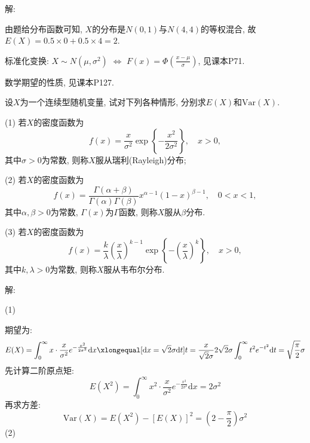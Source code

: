 \documentclass[standard]{ExBook}
\renewenvironment{shaded}{%
  \def\FrameCommand{\fboxsep=\FrameSep \colorbox{shadecolor}}%
  \MakeFramed{\advance\hsize-\width \FrameRestore}%
}{%
  \endMakeFramed
}
\begin{document}
\begin{qitems}
\vspace{\dimexpr2.5cm-5em\relax}

解: 

由题给分布函数可知, $X$的分布是$N(0,1)$与$N(4,4)$的等权混合, 故$E(X)=0.5\times0+0.5\times4=2$.

\textcolor{themeColor}{\selectfont {}
标准化变换: $X\sim N(\mu,\sigma^2)$ $\Longleftrightarrow$ $F(x)=\Phi(\frac{x-\mu}{\sigma})$, 见课本P71.}

\textcolor{themeColor}{\selectfont {}
数学期望的性质, 见课本P127.}

\vspace{2.5cm-5em}

    \begin{bbox}
    \begin{shaded}
        \qitem
设$X$为一个连续型随机变量, 试对下列各种情形, 分别求$E ( X ) $和$\mathrm{Var}(X)$.

(1) 若$X$的密度函数为
$$f(x)=\displaystyle\frac{x}{\sigma^2}\exp\left\{-\frac{x^2}{2\sigma^2}\right\},\quad x>0,$$
其中$\sigma>0$为常数, 则称$X$服从瑞利(Rayleigh)分布;

(2) 若$X$的密度函数为
$$f(x)=\displaystyle\frac{\Gamma(\alpha+\beta)}{\Gamma(\alpha)\Gamma(\beta)}x^{\alpha-1}(1-x)^{\beta-1},\quad 0<x<1,$$
其中$\alpha,\beta>0$为常数, $\Gamma(x)$为$\Gamma$函数, 则称$X$服从$\beta$分布.

(3) 若$X$的密度函数为
$$f(x)=\displaystyle\frac{k}{\lambda}\left(\frac{x}{\lambda}\right)^{k-1}\exp \left\{-\left(\frac{x}{\lambda}\right)^{k}\right\},\quad x>0,$$
其中$k, \lambda>0$为常数, 则称$X$服从韦布尔分布.
    \end{shaded}
    \end{bbox}

\vspace{\dimexpr2.5cm-5em\relax}

解: 

(1)

期望为:
$$\displaystyle E(X)=\int_{0}^{\infty}x\cdot \frac{x}{\sigma^2}e^{-\frac{x^2}{2\sigma^2}}\mathrm{d}x\xlongequal[\mathrm{d}x=\sqrt{2}\sigma\mathrm{d}t]{t=\frac{x}{\sqrt{2}\sigma}}2\sqrt{2}\sigma\int_{0}^{\infty}t^2 e^{-t^2}\mathrm{d}t=\sqrt{\frac{\pi}{2}}\sigma$$
先计算二阶原点矩:
$$E(X^2)=\int_{0}^{\infty}x^2\cdot \frac{x}{\sigma^2}e^{-\frac{x^2}{2\sigma^2}}\mathrm{d}x=2\sigma^2$$
再求方差:
$$\mathrm{Var}(X)=E(X^2)-\left[E(X)\right]^2=\left(2-\frac{\pi}{2}\right)\sigma^2$$
(2)


\end{qitems}
\end{document}
